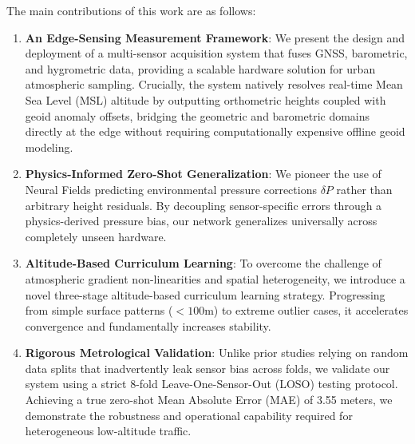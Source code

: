 The main contributions of this work are as follows:
\begin{enumerate}
    \item \textbf{An Edge-Sensing Measurement Framework}: We present the design and deployment of a multi-sensor acquisition system that fuses GNSS, barometric, and hygrometric data, providing a scalable hardware solution for urban atmospheric sampling. Crucially, the system natively resolves real-time Mean Sea Level (MSL) altitude by outputting orthometric heights coupled with geoid anomaly offsets, bridging the geometric and barometric domains directly at the edge without requiring computationally expensive offline geoid modeling.
    \item \textbf{Physics-Informed Zero-Shot Generalization}: We pioneer the use of Neural Fields predicting environmental pressure corrections $\delta P$ rather than arbitrary height residuals. By decoupling sensor-specific errors through a physics-derived pressure bias, our network generalizes universally across completely unseen hardware.
    \item \textbf{Altitude-Based Curriculum Learning}: To overcome the challenge of atmospheric gradient non-linearities and spatial heterogeneity, we introduce a novel three-stage altitude-based curriculum learning strategy. Progressing from simple surface patterns ($<100\text{m}$) to extreme outlier cases, it accelerates convergence and fundamentally increases stability.
    \item \textbf{Rigorous Metrological Validation}: Unlike prior studies relying on random data splits that inadvertently leak sensor bias across folds, we validate our system using a strict 8-fold Leave-One-Sensor-Out (LOSO) testing protocol. Achieving a true zero-shot Mean Absolute Error (MAE) of 3.55 meters, we demonstrate the robustness and operational capability required for heterogeneous low-altitude traffic.
\end{enumerate}